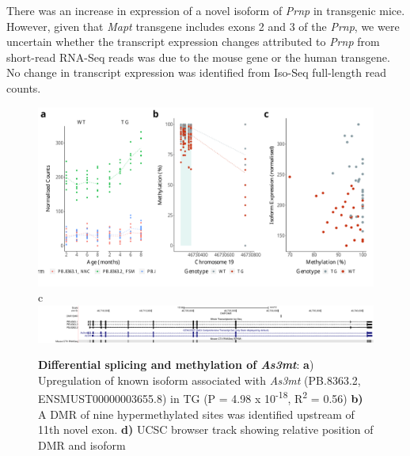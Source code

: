 There was an increase in expression of a novel isoform of \textit{Prnp} in transgenic mice. However, given that \textit{Mapt} transgene includes exons 2 and 3 of the \textit{Prnp}, we were uncertain whether the transcript expression changes attributed to \textit{Prnp} from short-read RNA-Seq reads was due to the mouse gene or the human transgene. No change in transcript expression was identified from Iso-Seq full-length read counts. 

\begin{figure}[htp]
	\includegraphics[page=1,scale = 0.4]{Figures/WholeDifferentialAnalysis_DMPDMR.pdf}
	\\
	\hspace*{0.2cm}\vspace{0.5cm}\large c
	\\
	\includegraphics[page=1,trim={1.5cm 0 0 0},scale = 0.9]{Figures/AS3MT_DMP.pdf}
	\captionsetup{width=0.95\textwidth}
	\caption[Differential splicing and methylation of \textit{As3mt}]%
	{\textbf{Differential splicing and methylation of \textit{As3mt}}: \textbf{a}) Upregulation of known isoform associated with \textit{As3mt} (PB.8363.2, ENSMUST00000003655.8) in TG (P = 4.98 x 10\textsuperscript{-18}, R\textsuperscript{2} = 0.56) \textbf{b)} A DMR of nine hypermethylated sites was identified upstream of 11th novel exon. \textbf{d)} UCSC browser track showing relative position of DMR and isoform}    
	\label{fig:IntMeth_As3mt}
\end{figure}	









